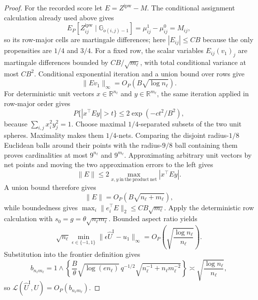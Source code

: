 \documentclass{article}
\begin{document}
\begin{proof}
For the recorded score let \(E=Z^{\mathrm{ipw}}-M\).  The conditional assignment calculation already used above gives
\[
 E_P[Z^{\mathrm{ipw}}_{ij}\mid\mathbb G_{o(i,j)-1}]
 =\mu^1_{ij}-\mu^0_{ij}=M_{ij},
\]
so its row-major cells are martingale differences; here \(|E_{ij}|\le C B\) because the only propensities are \(1/4\) and \(3/4\).  For a fixed row, the scalar variables \(E_{ij}(v_1)_j\) are martingale differences bounded by \(CB/\sqrt{m_\ell}\), with total conditional variance at most \(CB^2\).  Conditional exponential iteration and a union bound over rows give
\[
 \lVert Ev_1\rVert_\infty=O_P(B\sqrt{\log n_\ell}).
\]
For deterministic unit vectors \(x\in\mathbb R^{n_\ell}\) and \(y\in\mathbb R^{m_\ell}\), the same iteration applied in row-major order gives
\[
 P\{|x^\top Ey|>t\}\le2\exp(-ct^2/B^2),
\]
because \(\sum_{i,j}x_i^2y_j^2=1\).  Choose maximal \(1/4\)-separated subsets of the two unit spheres.  Maximality makes them \(1/4\)-nets.  Comparing the disjoint radius-\(1/8\) Euclidean balls around their points with the radius-\(9/8\) ball containing them proves cardinalities at most \(9^{n_\ell}\) and \(9^{m_\ell}\).  Approximating arbitrary unit vectors by net points and moving the two approximation errors to the left gives
\[
 \lVert E\rVert
 \le2\max_{x,y\ \mathrm{in\ the\ product\ net}}|x^\top Ey|.
\]
A union bound therefore gives
\[
 \lVert E\rVert=O_P(B\sqrt{n_\ell+m_\ell}),
\]
while boundedness gives \(\max_i\lVert e_i^\top E\rVert_2\le CB\sqrt{m_\ell}\).  Apply the deterministic row calculation with \(s_0=g=\theta\sqrt{n_\ell m_\ell}\).  Bounded aspect ratio yields
\[
 \sqrt{n_\ell}\min_{\epsilon\in\{-1,1\}}
 \lVert\epsilon\widehat U^{\mathrm I}-u_1\rVert_\infty
 =O_P\!\left(\sqrt{\frac{\log n_\ell}{n_\ell}}\right).
\]
Substitution into the frontier definition gives
\[
 b_{n_\ell m_\ell}
 =1\wedge\left\{
 \frac B\theta\sqrt{\log(en_\ell)}\,
 q^{-1/2}\sqrt{n_\ell^{-1}+n_\ell m_\ell^{-2}}
 \right\}
 \asymp\sqrt{\frac{\log n_\ell}{n_\ell}},
\]
so \(\mathcal L(\widehat U^{\mathrm I},U)=O_P(b_{n_\ell m_\ell})\).


\end{proof}
\end{document}
